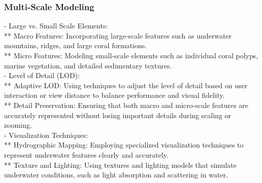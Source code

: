 \subsubsection{Multi-Scale Modeling}
- Large vs. Small Scale Elements: \\
** Macro Features: Incorporating large-scale features such as underwater mountains, ridges, and large coral formations. \\
** Micro Features: Modeling small-scale elements such as individual coral polyps, marine vegetation, and detailed sedimentary textures. \\
- Level of Detail (LOD): \\
** Adaptive LOD: Using techniques to adjust the level of detail based on user interaction or view distance to balance performance and visual fidelity. \\
** Detail Preservation: Ensuring that both macro and micro-scale features are accurately represented without losing important details during scaling or zooming. \\
- Visualization Techniques: \\
** Hydrographic Mapping: Employing specialized visualization techniques to represent underwater features clearly and accurately. \\
** Texture and Lighting: Using textures and lighting models that simulate underwater conditions, such as light absorption and scattering in water.


